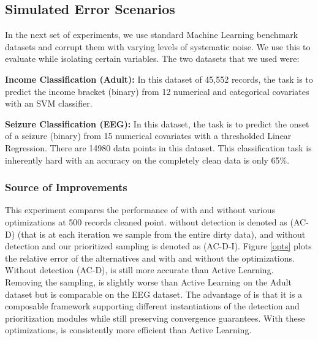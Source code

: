 \subsection{Simulated Error Scenarios}
In the next set of experiments, we use standard Machine Learning benchmark datasets and corrupt them with varying levels of systematic noise.
We use this to evaluate \sys while isolating certain variables.
The two datasets that we used were:

\vspace{0.25em}

\noindent\textbf{Income Classification (Adult): } In this dataset of 45,552 records, the task is to predict the income bracket (binary) from 12 numerical and categorical covariates with an SVM classifier. 

\vspace{0.25em}

\noindent\textbf{Seizure Classification (EEG): } In this dataset, the task is to predict the onset of a seizure (binary) from 15 numerical covariates with a thresholded Linear Regression. There are 14980 data points in this dataset. This classification task is inherently hard with an accuracy on the completely clean data is only 65\%.

\subsubsection{Source of Improvements}\label{comp}
This experiment compares the performance of \sys with and without various optimizations at 500 records cleaned point. 
\sys without detection is denoted as (AC-D) (that is at each iteration we sample from the entire dirty data), and \sys without detection and our prioritized sampling is denoted as (AC-D-I).
Figure \ref{opts} plots the relative error of the alternatives and \sys with and without the optimizations.
Without detection (AC-D), \sys is still more accurate than Active Learning.
Removing the sampling, \sys is slightly worse than Active Learning on the Adult dataset but is comparable on the EEG dataset.
The advantage of \sys is that it is a composable framework supporting different instantiations of the detection and prioritization modules while still preserving convergence guarantees.
With these optimizations, \sys is consistently more efficient than Active Learning.

